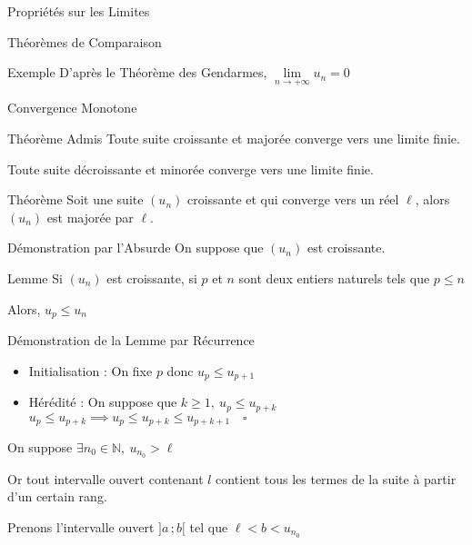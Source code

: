 \documentclass{cours}
\begin{document}
\begin{Gpartie}{Propriétés sur les Limites}
\begin{Spartie}{Théorèmes de Comparaison}
\begin{SSpartie}{Exemple}
                D'après le Théorème des Gendarmes, $\lim\limits_{n\to +\infty}u_n=0$
            \end{SSpartie}
        \end{Spartie}
        \pagebreak
        \begin{Spartie}{Convergence Monotone} 
            \begin{SSpartie}{Théorème Admis} 
                Toute suite croissante et majorée converge vers une limite finie.

                Toute suite décroissante et minorée converge vers une limite finie.
            \end{SSpartie}
            \begin{SSpartie}{Théorème} 
                Soit une suite $(u_n)$ croissante et qui converge vers un réel $\ell$, alors $(u_n)$ est majorée par $\ell$.
                \begin{SSSpartie}{Démonstration par l'Absurde} 
                    On suppose que $(u_n)$ est croissante.
                    \begin{SSSSpartie}{Lemme} 
                        Si $(u_n)$ est croissante, si $p$ et $n$ sont deux entiers naturels tels que $p\leq n$

                        Alors, $u_p\leq u_n$
                    \end{SSSSpartie}
                    \begin{SSSSpartie}{Démonstration de la Lemme par Récurrence}
                        \vspace{-1em}
                        \begin{itemize}
                            \item Initialisation : On fixe $p$ donc $u_p\leq u_{p+1}$
                            \item Hérédité : On suppose que $k\geq 1,\ u_p\leq u_{p+k}$ \\
                            \phantom{Hérédité : }$u_p\leq u_{p+k}\implies u_p\leq u_{p+k}\leq u_{p+k+1}\quad\square$
                        \end{itemize}   
                    \end{SSSSpartie}
                    On suppose $\exists n_0\in\mathbb{N},\ u_{n_0}>\ell$

                    Or tout intervalle ouvert contenant $l$ contient tous les termes de la suite à partir d'un certain rang.

                    Prenons l'intervalle ouvert $\big]a\,;b\big[$ tel que $\ell<b<u_{n_0}$


\end{SSSpartie}
\end{SSpartie}
\end{Spartie}
\end{Gpartie}
\end{document}
